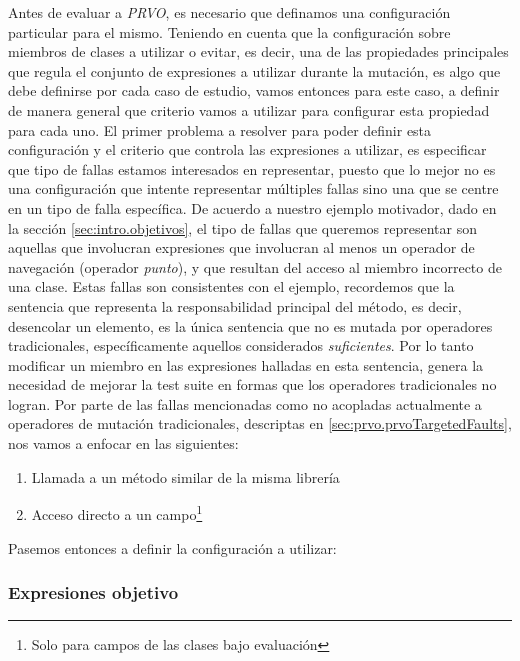 Antes de evaluar a \emph{PRVO}, es necesario que definamos una configuraci\'on particular para el mismo. Teniendo en cuenta que la configuraci\'on sobre miembros de clases a utilizar o evitar, es decir, una de las propiedades principales que regula el conjunto de expresiones a utilizar durante la mutaci\'on, es algo que debe definirse por cada caso de estudio, vamos entonces para este caso, a definir de manera general que criterio vamos a utilizar para configurar esta propiedad para cada uno. El primer problema a resolver para poder definir esta configuraci\'on y el criterio que controla las expresiones a utilizar, es especificar que tipo de fallas estamos interesados en representar, puesto que lo mejor no es una configuraci\'on que intente representar m\'ultiples fallas sino una que se centre en un tipo de falla espec\'ifica. De acuerdo a nuestro ejemplo motivador, dado en la secci\'on \ref{sec:intro.objetivos}, el tipo de fallas que queremos representar son aquellas que involucran expresiones que involucran al menos un operador de navegaci\'on (operador \emph{punto}), y que resultan del acceso al miembro incorrecto de una clase. Estas fallas son consistentes con el ejemplo, recordemos que la sentencia que representa la responsabilidad principal del m\'etodo, es decir, desencolar un elemento, es la \'unica sentencia que no es mutada por operadores tradicionales, espec\'ificamente aquellos considerados \emph{suficientes}. Por lo tanto modificar un miembro en las expresiones halladas en esta sentencia, genera la necesidad de mejorar la test suite en formas que los operadores tradicionales no logran. Por parte de las fallas mencionadas como no acopladas actualmente a operadores de mutaci\'on tradicionales, descriptas en \ref{sec:prvo.prvoTargetedFaults}, nos vamos a enfocar en las siguientes:

\begin{enumerate}[label=\arabic*), leftmargin=.75cm,align=left]
	\item Llamada a un m\'etodo similar de la misma librer\'ia
	\item Acceso directo a un campo\footnote{Solo para campos de las clases bajo evaluaci\'on}
\end{enumerate}

Pasemos entonces a definir la configuraci\'on a utilizar:

\subsubsection{Expresiones objetivo}

